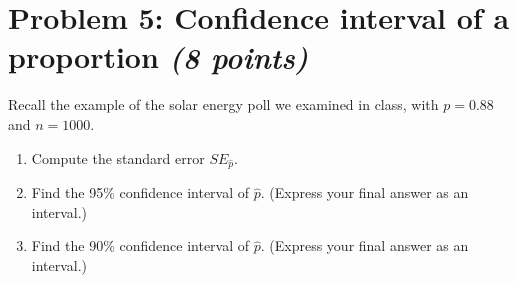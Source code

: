\documentclass[11pt,twoside]{article}
\newcommand{\pts}[1]{\marginpar{ \small\hspace{0pt} \textit{[#1]} } }
\numberwithin{equation}{section}
\newcommand{\?}{\stackrel{?}{=}}
\begin{document}
\eject


\section*{Problem 5: Confidence interval of a proportion \textit{(8 points)}}
Recall the example of the solar energy poll we examined in class, with $p=0.88$ and $n=1000$.

  \begin{enumerate}[\bf (a)]
  \item Compute the standard error $SE_{\hat p}$. \pts{2}
       \vspace{20ex}

       
\item Find the 95\% confidence interval of $\hat p$. (Express your final answer as an interval.) \pts{2}

   \vspace{40ex}


  
\item Find the 90\% confidence interval of $\hat p$. (Express your final answer as an interval.) \pts{2}

 
\end{enumerate}

 
\end{document}
